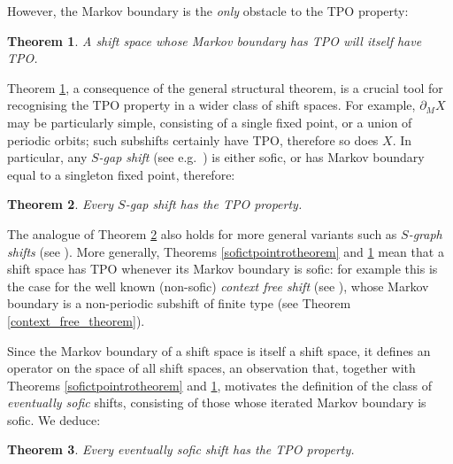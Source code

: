 \documentclass[reqno,11pt]{amsart}
\newtheorem{thm}{Theorem}[section]
\theoremstyle{definition}
\theoremstyle{remark}
\theoremstyle{remark}
\numberwithin{equation}{section}
\begin{document}
However, the Markov boundary is the \emph{only} obstacle to the TPO property: 

\begin{thm}\label{partialX_tpo_implies_X_tpo}
A 
shift space whose Markov boundary has TPO will itself have TPO.
\end{thm}

Theorem \ref{partialX_tpo_implies_X_tpo}, a consequence of the general structural theorem, is 
a crucial tool for recognising the TPO property in a wider class of shift spaces. 
For example,
 $\partial_M X$ may be particularly simple, consisting of a single fixed point,
or a union of periodic orbits; such subshifts certainly have TPO, therefore so does $X$.
In particular, any \emph{$S$-gap shift} (see e.g.~\cite[\S 1.2]{LM95}) is either sofic, or has Markov boundary 
equal to a singleton fixed point, therefore:

\begin{thm}\label{sgaptpointrotheorem}
Every $S$-gap shift has the 
TPO
property.
\end{thm}

The analogue of Theorem \ref{sgaptpointrotheorem}
also holds for more general variants such as \emph{$S$-graph shifts}
(see \cite{Di22}).
More generally, Theorems \ref{sofictpointrotheorem} and \ref{partialX_tpo_implies_X_tpo}
mean that a shift space has TPO whenever its Markov boundary is sofic: for example
this is the case for the well known (non-sofic) \emph{context free shift} (see \cite[\S 1.2]{LM95}),
whose Markov boundary is a non-periodic subshift of finite type
(see Theorem \ref{context_free_theorem}).

Since the Markov boundary of a shift space is itself a shift space, it defines
an operator on the space of all shift spaces, an observation that,
together with Theorems \ref{sofictpointrotheorem} and \ref{partialX_tpo_implies_X_tpo},
motivates the definition
of the class of \emph{eventually sofic} shifts, consisting of those whose iterated Markov boundary is sofic.
We deduce:

\begin{thm}\label{eventuallysofictpointrotheorem}
Every eventually sofic shift has the 
TPO
property.
\end{thm}
\end{document}
